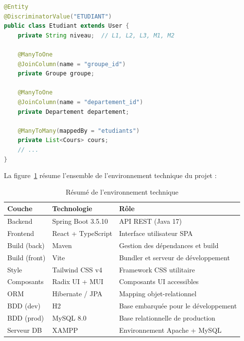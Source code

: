 \begin{lstlisting}[language=Java,caption={Héritage JPA — Entité Etudiant}]
@Entity
@DiscriminatorValue("ETUDIANT")
public class Etudiant extends User {
    private String niveau;  // L1, L2, L3, M1, M2

    @ManyToOne
    @JoinColumn(name = "groupe_id")
    private Groupe groupe;

    @ManyToOne
    @JoinColumn(name = "departement_id")
    private Departement departement;

    @ManyToMany(mappedBy = "etudiants")
    private List<Cours> cours;
    // ...
}
\end{lstlisting}

\vspace{0.5cm}

La figure~\ref{fig:env_resume} résume l'ensemble de l'environnement technique du projet :

\begin{table}[H]
\centering
\caption{Résumé de l'environnement technique}
\label{fig:env_resume}
\begin{tabularx}{\textwidth}{llX}
\toprule
\textbf{Couche} & \textbf{Technologie} & \textbf{Rôle} \\
\midrule
Backend & Spring Boot 3.5.10 & API REST (Java 17) \\
Frontend & React + TypeScript & Interface utilisateur SPA \\
Build (back) & Maven & Gestion des dépendances et build \\
Build (front) & Vite & Bundler et serveur de développement \\
Style & Tailwind CSS v4 & Framework CSS utilitaire \\
Composants & Radix UI + MUI & Composants UI accessibles \\
ORM & Hibernate / JPA & Mapping objet-relationnel \\
BDD (dev) & H2 & Base embarquée pour le développement \\
BDD (prod) & MySQL 8.0 & Base relationnelle de production \\
Serveur DB & XAMPP & Environnement Apache + MySQL \\
\bottomrule
\end{tabularx}
\end{table}

\newpage
